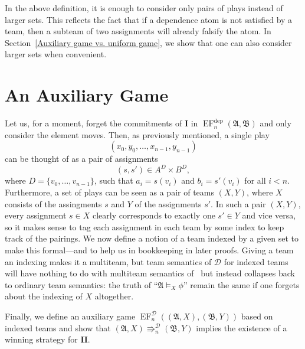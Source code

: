 \documentclass[10pt,a4paper]{amsart}
\newcommand{\playerone}{\mathrm{\mathbf{I}}}
\newcommand{\playertwo}{\mathrm{\mathbf{II}}}
\DeclareMathOperator{\EF}{EF}
\newcommand{\EFdep}{\EF^{\mathrm{dep}}}
\newcommand{\A}{\mathfrak{A}}
\newcommand{\B}{\mathfrak{B}}
\newcommand{\posEquiv}{\mathbin{\Rrightarrow}}
\newcommand{\deplog}{\mathcal D}
\begin{document}
In the above definition, it is enough to consider only pairs of plays instead of larger sets. This reflects the fact that if a dependence atom is not satisfied by a team, then a subteam of two assignments will already falsify the atom. In Section~\ref{Auxiliary game vs. uniform game}, we show that one can also consider larger sets when convenient.





\section{An Auxiliary Game}\label{An Auxiliary Game}

Let us, for a moment, forget the commitments of $\playerone$ in $\EFdep_n(\A,\B)$ and only consider the element moves. Then, as previously mentioned, a single play
\[
    (x_0,y_0,\dots,x_{n-1},y_{n-1})
\]
can be thought of as a pair of assignments
\[
    (s,s')\in A^D\times B^D,
\]
where $D = \{v_0,\dots,v_{n-1}\}$, such that $a_i = s(v_i)$ and $b_i = s'(v_i)$ for all $i<n$. Furthermore, a set of plays can be seen as a pair of teams $(X,Y)$, where $X$ consists of the assingments $s$ and $Y$ of the assignments $s'$. In such a pair $(X,Y)$, every assignment $s\in X$ clearly corresponds to exactly one $s'\in Y$ and vice versa, so it makes sense to tag each assignment in each team by some index to keep track of the pairings. We now define a notion of a team indexed by a given set to make this formal---and to help us in bookkeeping in later proofs. Giving a team an indexing makes it a multiteam, but team semantics of $\deplog$ for indexed teams will have nothing to do with multiteam semantics of~\cite{MR3833654} but instead collapses back to ordinary team semantics: the truth of ``$\A\models_X\phi$'' remain the same if one forgets about the indexing of $X$ altogether.

Finally, we define an auxiliary game $\EF^\deplog_n((\A,X),(\B,Y))$ based on indexed teams and show that $(\A,X)\posEquiv^\deplog_n(\B,Y)$ implies the existence of a winning strategy for $\playertwo$.
\end{document}
